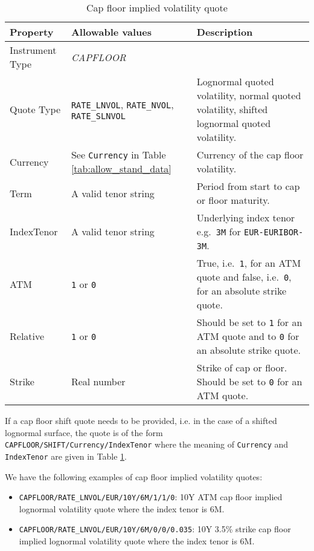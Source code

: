 \begin{table}[H]
\centering
  \begin{tabular}{|p{3cm}|p{3.5cm}|p{7cm}|}
    \hline
    {\bf Property} & {\bf Allowable values} & {\bf Description} \\ \hline
    Instrument Type & \emph{CAPFLOOR} & \\ \hline
    Quote Type & \lstinline!RATE_LNVOL!, \lstinline!RATE_NVOL!, \lstinline!RATE_SLNVOL! & Lognormal quoted volatility, normal quoted volatility, shifted lognormal quoted volatility. \\ \hline
    Currency & See \lstinline!Currency! in Table \ref{tab:allow_stand_data}&  Currency of the cap floor volatility. \\ \hline
    Term & A valid tenor string & Period from start to cap or floor maturity. \\ \hline
    IndexTenor & A valid tenor string & Underlying index tenor e.g.\ \lstinline!3M! for \lstinline!EUR-EURIBOR-3M!. \\ \hline
    ATM & \lstinline!1! or \lstinline!0! & True, i.e.\ \lstinline!1!, for an ATM quote and false, i.e.\ \lstinline!0!, for an absolute strike quote. \\ \hline
    Relative & \lstinline!1! or \lstinline!0! & Should be set to \lstinline!1! for an ATM quote and to \lstinline!0! for an absolute strike quote. \\ \hline
    Strike & Real number & Strike of cap or floor. Should be set to \lstinline!0! for an ATM quote. \\ \hline
  \end{tabular}
  \caption{Cap floor implied volatility quote}
  \label{tab:capfloor_implvol_quote}
\end{table}

If a cap floor shift quote needs to be provided, i.e. in the case of a shifted lognormal surface, the quote is of the form \lstinline!CAPFLOOR/SHIFT/Currency/IndexTenor! where the meaning of \lstinline!Currency! and \lstinline!IndexTenor! are given in Table \ref{tab:capfloor_implvol_quote}.

We have the following examples of cap floor implied volatility quotes:
\begin{itemize}
\item \lstinline!CAPFLOOR/RATE_LNVOL/EUR/10Y/6M/1/1/0!: 10Y ATM cap floor implied lognormal volatility quote where the index tenor is 6M.
\item \lstinline!CAPFLOOR/RATE_LNVOL/EUR/10Y/6M/0/0/0.035!: 10Y 3.5\% strike cap floor implied lognormal volatility quote where the index tenor is 6M.
\end{itemize}


